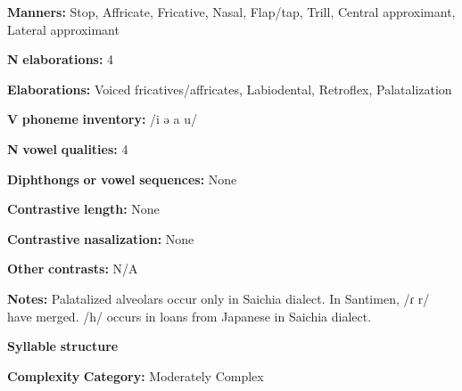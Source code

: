 \begin{styleBody}
\textbf{Manners:} Stop, Affricate, Fricative, Nasal, Flap/tap, Trill, Central approximant, Lateral approximant
\end{styleBody}

\begin{styleBody}
\textbf{N} \textbf{elaborations:} 4
\end{styleBody}

\begin{styleBody}
\textbf{Elaborations:} Voiced fricatives/affricates, Labiodental, Retroflex, Palatalization
\end{styleBody}

\begin{styleBody}
\textbf{V} \textbf{phoneme} \textbf{inventory:} /i ə a u/
\end{styleBody}

\begin{styleBody}
\textbf{N} \textbf{vowel} \textbf{qualities:} 4
\end{styleBody}

\begin{styleBody}
\textbf{Diphthongs} \textbf{or} \textbf{vowel} \textbf{sequences:} None
\end{styleBody}

\begin{styleBody}
\textbf{Contrastive} \textbf{length:} None
\end{styleBody}

\begin{styleBody}
\textbf{Contrastive} \textbf{nasalization:} None
\end{styleBody}

\begin{styleBody}
\textbf{Other} \textbf{contrasts:} N/A
\end{styleBody}

\begin{styleBody}
\textbf{Notes:} Palatalized alveolars occur only in Saichia dialect. In Santimen, /ɾ r/ have merged. /h/ occurs in loans from Japanese in Saichia dialect.
\end{styleBody}

\begin{styleBody}
\textbf{Syllable} \textbf{structure}
\end{styleBody}

\begin{styleBody}
\textbf{Complexity} \textbf{Category:} Moderately Complex
\end{styleBody}

